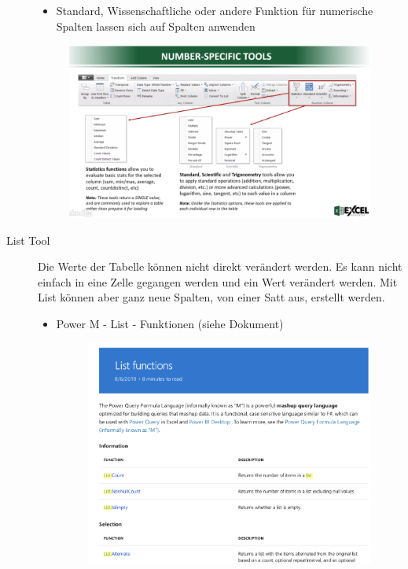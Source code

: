 \begin{description}
\begin{itemize}
\begin{figure}[H]
	\caption{}
	\label{fig:screenshot026}
\end{figure}
\item Standard, Wissenschaftliche oder andere Funktion für numerische Spalten lassen sich auf Spalten anwenden
\end{itemize}
\begin{figure}[H]
	\centering
	\includegraphics[scale = 0.3]{attachment/chapter_1/screenshot025}
	\caption{}
	\label{fig:screenshot025}
\end{figure}
\item[List Tool] Die Werte der Tabelle können nicht direkt verändert werden. Es kann nicht einfach in eine Zelle gegangen werden und ein Wert verändert werden. Mit List können aber ganz neue Spalten, von einer Satt aus, erstellt werden. 
\begin{itemize}
\item Power M - List - Funktionen (siehe Dokument)
\begin{figure}[H]
	\centering
	\includegraphics[scale = 0.3]{attachment/chapter_1/screenshot027}

\end{figure}
\end{itemize}
\end{description}
